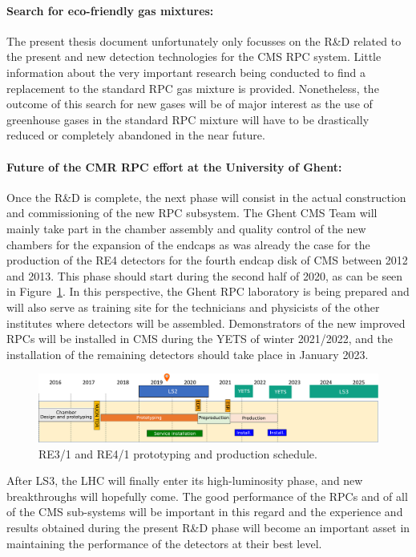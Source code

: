 	\paragraph*{Search for eco-friendly gas mixtures:} The present thesis document unfortunately only focusses on the R\&D related to the present and new detection technologies for the CMS RPC system. Little information about the very important research being conducted to find a replacement to the standard RPC gas mixture is provided. Nonetheless, the outcome of this search for new gases will be of major interest as the use of greenhouse gases in the standard RPC mixture will have to be drastically reduced or completely abandoned in the near future.
	
	\paragraph*{Future of the CMR RPC effort at the University of Ghent:} Once the R\&D is complete, the next phase will consist in the actual construction and commissioning of the new RPC subsystem. The Ghent CMS Team will mainly take part in the chamber assembly and quality control of the new chambers for the expansion of the endcaps as was already the case for the production of the RE4 detectors for the fourth endcap disk of CMS between 2012 and 2013. This phase should start during the second half of 2020, as can be seen in Figure~\ref{fig:milestones}. In this perspective, the Ghent RPC laboratory is being prepared and will also serve as training site for the technicians and physicists of the other institutes where detectors will be assembled. Demonstrators of the new improved RPCs will be installed in CMS during the \acl{YETS} of winter 2021/2022, and the installation of the remaining detectors should take place in January 2023.
	
	\begin{figure}[H]
	    \centering
	    \includegraphics[width=\linewidth]{fig/chapt7/CMS-RPC-Milestones.pdf}
	    \caption{\label{fig:milestones} RE3/1 and RE4/1 prototyping and production schedule.}
	\end{figure}
	
	After LS3, the LHC will finally enter its high-luminosity phase, and new breakthroughs will hopefully come. The good performance of the RPCs and of all of the CMS sub-systems will be important in this regard and the experience and results obtained during the present R\&D phase will become an important asset in maintaining the performance of the detectors at their best level.

\clearpage{\pagestyle{empty}\cleardoublepage}